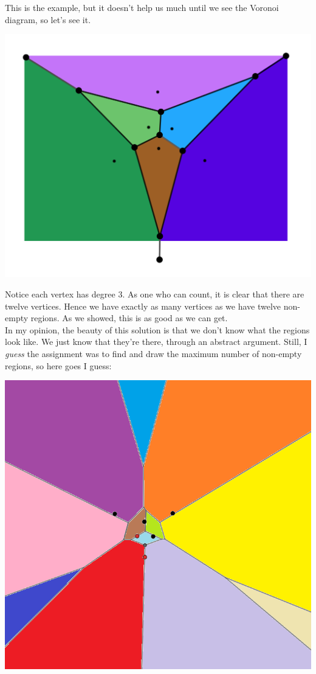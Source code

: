 \documentclass[12pt]{article}
\theoremstyle{definition}
\begin{document}
This is the example, but it doesn't help us much until we see the Voronoi diagram, so let's see it.

\includegraphics[scale=0.5]{second_order_voronoi.png} 

Notice each vertex has degree 3. As one who can count, it is clear that there are twelve vertices. Hence we have exactly as many vertices as we have twelve non-empty regions. As we showed, this is as good as we can get. \\


In my opinion, the beauty of this solution is that we don't know what the regions look like. We just know that they're there, through an abstract argument. Still, I \textit{guess} the assignment was to find and draw the maximum number of non-empty regions, so here goes I guess:

\includegraphics[scale=0.50]{Order_2_Voronoi.png} 
\end{document}
